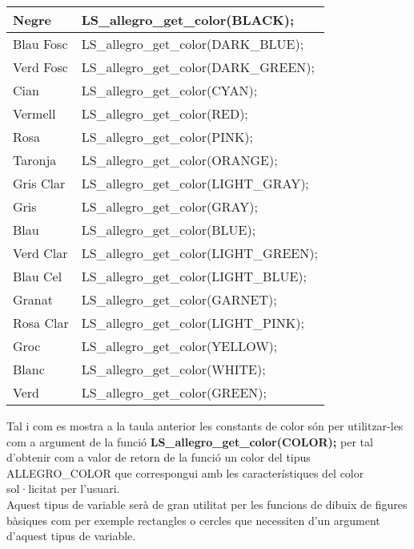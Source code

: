 \documentclass[11pt]{article}
\begin{document}
\begin{center}
	\begin{tabular}{| l | l |}
  		\hline                       
  		Negre & LS\_allegro\_get\_color(BLACK); \\
  		\hline
  		Blau Fosc & LS\_allegro\_get\_color(DARK\_BLUE); \\
  		\hline
  		Verd Fosc & LS\_allegro\_get\_color(DARK\_GREEN); \\
  		\hline
  		Cian & LS\_allegro\_get\_color(CYAN); \\
  		\hline
  		Vermell & LS\_allegro\_get\_color(RED); \\
  		\hline
  		Rosa & LS\_allegro\_get\_color(PINK); \\
  		\hline
  		Taronja & LS\_allegro\_get\_color(ORANGE); \\
  		\hline
  		Gris Clar & LS\_allegro\_get\_color(LIGHT\_GRAY); \\
  		\hline
  		Gris & LS\_allegro\_get\_color(GRAY); \\
  		\hline
  		Blau & LS\_allegro\_get\_color(BLUE); \\
  		\hline
  		Verd Clar & LS\_allegro\_get\_color(LIGHT\_GREEN); \\
  		\hline
  		Blau Cel & LS\_allegro\_get\_color(LIGHT\_BLUE); \\
  		\hline
  		Granat & LS\_allegro\_get\_color(GARNET); \\
  		\hline
  		Rosa Clar & LS\_allegro\_get\_color(LIGHT\_PINK); \\
  		\hline
  		Groc & LS\_allegro\_get\_color(YELLOW); \\
  		\hline
  		Blanc & LS\_allegro\_get\_color(WHITE); \\
  		\hline
  		Verd & LS\_allegro\_get\_color(GREEN); \\
  		\hline  
	\end{tabular}
\end{center}

\noindent Tal i com es mostra a la taula anterior les constants de color són per utilitzar-les com a argument de la funció \textbf{LS\_allegro\_get\_color(COLOR);} per tal d'obtenir com a valor de retorn de la funció un color del tipus ALLEGRO\_COLOR que correspongui amb les característiques del color sol·licitat per l'usuari.\\ Aquest tipus de variable serà de gran utilitat per les funcions de dibuix de figures bàsiques com per exemple rectangles o cercles que necessiten d'un argument d'aquest tipus de variable.
\end{document}
